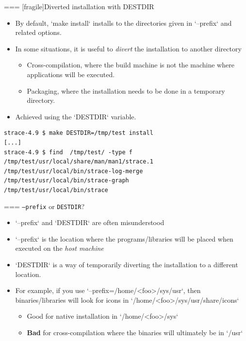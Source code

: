 === [fragile]{Diverted installation with DESTDIR}

  \begin{itemize}

  \item By default, `make install` installs to the directories
    given in `--prefix` and related options.

  \item In some situations, it is useful to {\em divert} the
    installation to another directory
    \begin{itemize}
    \item Cross-compilation, where the build machine is not the
      machine where applications will be executed.
    \item Packaging, where the installation needs to be done in a
      temporary directory.
    \end{itemize}

  \item Achieved using the `DESTDIR` variable.
  \end{itemize}

  \begin{block}{}
{\tiny
\begin{verbatim}
strace-4.9 $ make DESTDIR=/tmp/test install
[...]
strace-4.9 $ find  /tmp/test/ -type f
/tmp/test/usr/local/share/man/man1/strace.1
/tmp/test/usr/local/bin/strace-log-merge
/tmp/test/usr/local/bin/strace-graph
/tmp/test/usr/local/bin/strace
\end{verbatim}}
\end{block}



=== {{\tt --prefix} or {\tt DESTDIR}?}
  \begin{itemize}
  \item `--prefix` and `DESTDIR` are often misunderstood
  \item `--prefix` is the location where the programs/libraries
    will be placed when executed on the {\em host machine}
  \item `DESTDIR` is a way of temporarily diverting the
    installation to a different location.

  \item For example, if you use `--prefix=/home/<foo>/sys/usr`,
    then binaries/libraries will look for icons in
    `/home/<foo>/sys/usr/share/icons`
    \begin{itemize}
    \item Good for native installation in `/home/<foo>/sys`
    \item {\bf Bad} for cross-compilation where the binaries will
      ultimately be in `/usr`
    \end{itemize}

  \end{itemize}


